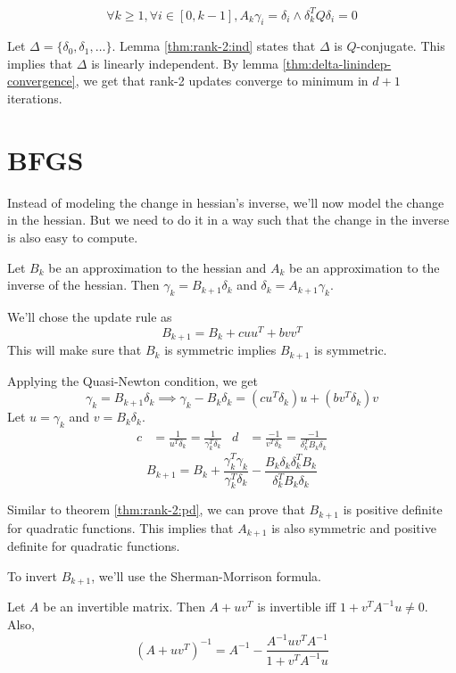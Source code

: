 \begin{lemma} \label{thm:rank-2:ind}
\[ \forall k \ge 1, \forall i \in [0, k-1], A_k\gamma_i = \delta_i \wedge \delta_k^TQ\delta_i = 0 \]
\end{lemma}

Let $\Delta = \{\delta_0, \delta_1, \ldots\}$.
Lemma \ref{thm:rank-2:ind} states that $\Delta$ is $Q$-conjugate.
This implies that $\Delta$ is linearly independent.
By lemma \ref{thm:delta-linindep-convergence},
we get that rank-2 updates converge to minimum in $d+1$ iterations.

\section{BFGS}

Instead of modeling the change in hessian's inverse,
we'll now model the change in the hessian.
But we need to do it in a way such that the change in the inverse is also easy to compute.

Let $B_k$ be an approximation to the hessian and $A_k$ be an approximation to the inverse of the hessian.
Then $\gamma_k = B_{k+1}\delta_k$ and $\delta_k = A_{k+1}\gamma_k$.

We'll chose the update rule as
\[ B_{k+1} = B_k + cuu^T + bvv^T \]
This will make sure that $B_k$ is symmetric implies $B_{k+1}$ is symmetric.

Applying the Quasi-Newton condition, we get
\[ \gamma_k = B_{k+1}\delta_k
\implies \gamma_k - B_k\delta_k = (cu^T\delta_k)u + (bv^T\delta_k)v \]
Let $u = \gamma_k$ and $v = B_k\delta_k$.
\begin{align*} c &= \frac{1}{u^T\delta_k} = \frac{1}{\gamma_k^T\delta_k}
& d &= \frac{-1}{v^T\delta_k} = \frac{-1}{\delta_k^TB_k\delta_k} \end{align*}
\[ B_{k+1} = B_k + \frac{\gamma_k^T\gamma_k}{\gamma_k^T\delta_k}
- \frac{B_k\delta_k\delta_k^TB_k}{\delta_k^TB_k\delta_k} \]

Similar to theorem \ref{thm:rank-2:pd}, we can prove that
$B_{k+1}$ is positive definite for quadratic functions.
This implies that $A_{k+1}$ is also symmetric and positive definite
for quadratic functions.

To invert $B_{k+1}$, we'll use the Sherman-Morrison formula.

\begin{theorem}
Let $A$ be an invertible matrix. Then $A + uv^T$ is invertible iff $1 + v^TA^{-1}u \neq 0$. Also,
\[ (A + uv^T)^{-1} = A^{-1} - \frac{A^{-1}uv^TA^{-1}}{1 + v^TA^{-1}u} \]
\end{theorem}

